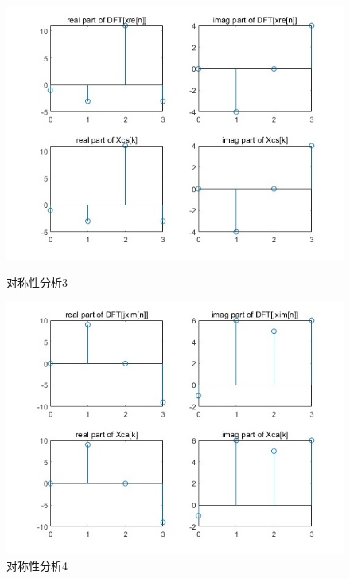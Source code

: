 \documentclass[a4paper,12pt]{article}
\begin{document}
\begin{figure}[h]
    \centering
    \begin{minipage}[b]{0.48\textwidth}
        \centering
        \includegraphics[width=\linewidth]{images/2_Verify/symmetry3.jpg}
        \caption{对称性分析3}
    \end{minipage}
    \hfill
    \begin{minipage}[b]{0.48\textwidth}
        \centering
        \includegraphics[width=\linewidth]{images/2_Verify/symmetry4.jpg}
        \caption{对称性分析4}
    \end{minipage}
\end{figure}
\end{document}
